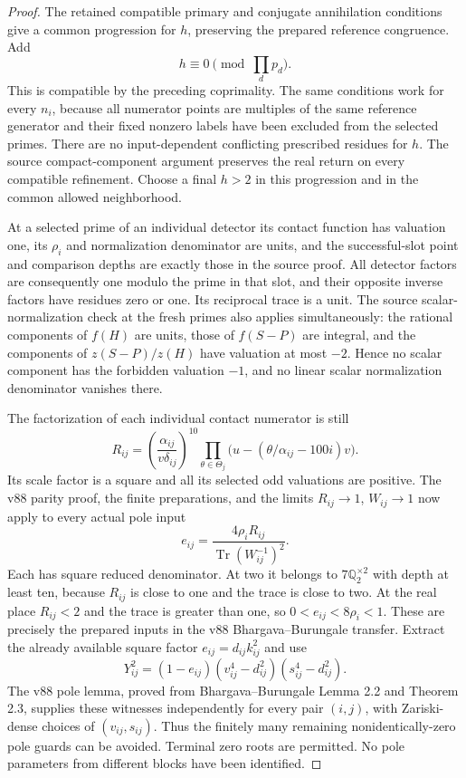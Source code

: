 \documentclass[11pt]{article}
\begin{document}
\begin{proof}
The retained compatible primary and conjugate annihilation
conditions give a common progression for $h$, preserving the
prepared reference congruence.  Add
\[
                            h\equiv0\pmod{\prod_d p_d}.
\]
This is compatible by the preceding coprimality.  The same
conditions work for every $n_i$, because all numerator points are
multiples of the same reference generator and their fixed nonzero
labels have been excluded from the selected primes.  There are
no input-dependent conflicting prescribed residues for $h$.
The source compact-component argument preserves the real return
on every compatible refinement.  Choose a final $h>2$ in this
progression and in the common allowed neighborhood.

At a selected prime of an individual detector its contact
function has valuation one, its $\rho_i$ and normalization
denominator are units, and the successful-slot point and comparison
depths are exactly those in the source proof.  All detector factors
are consequently one modulo the prime in that slot, and their
opposite inverse factors have residues zero or one.  Its reciprocal
trace is a unit.  The source scalar-normalization check at the fresh
primes also applies simultaneously: the rational components of
$f(H)$ are units, those of $f(S-P)$ are integral, and the components
of $z(S-P)/z(H)$ have valuation at most $-2$.  Hence no scalar
component has the forbidden valuation $-1$, and no linear scalar
normalization denominator vanishes there.

The factorization of each individual contact numerator is still
\[
 R_{ij}=\left(\frac{\alpha_{ij}}{v\delta_{ij}}\right)^{10}
         \prod_{\theta\in\Theta_j}
           \bigl(u-(\theta/\alpha_{ij}-100i)v\bigr).
\]
Its scale factor is a square and all its selected odd valuations
are positive.  The v88 parity proof, the finite preparations, and
the limits $R_{ij}\to1$, $W_{ij}\to1$ now apply to every actual
pole input
\[
                    e_{ij}=\frac{4\rho_iR_{ij}}
                              {\operatorname{Tr}(W_{ij}^{-1})^2}.
\]
Each has square reduced denominator.  At two it belongs to
$7\mathbb Q_2^{\times2}$ with depth at least ten, because $R_{ij}$
is close to one and the trace is close to two.  At the real place
$R_{ij}<2$ and the trace is greater than one, so
$0<e_{ij}<8\rho_i<1$.  These are precisely the prepared inputs
in the v88 Bhargava--Burungale transfer.  Extract the already
available square factor $e_{ij}=d_{ij}k_{ij}^2$ and use
\[
 Y_{ij}^2=(1-e_{ij})(v_{ij}^4-d_{ij}^2)
                         (s_{ij}^4-d_{ij}^2).
\]
The v88 pole lemma, proved from Bhargava--Burungale Lemma 2.2
and Theorem 2.3, supplies these witnesses independently for every
pair $(i,j)$, with Zariski-dense choices of $(v_{ij},s_{ij})$.
Thus the finitely many remaining nonidentically-zero pole guards
can be avoided.  Terminal zero roots are permitted.  No pole
parameters from different blocks have been identified.
\end{proof}
\end{document}
